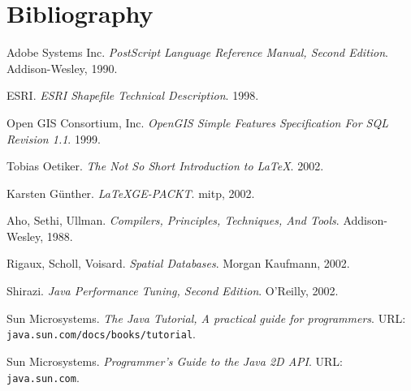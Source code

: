 
\section{Bibliography}

\begin{thebibliography}{99}

Adobe Systems Inc. \emph{PostScript Language Reference Manual, Second
Edition}.  Addison-Wesley, 1990.

ESRI. \emph{ESRI Shapefile Technical Description}. 1998.

Open GIS Consortium, Inc. \emph{OpenGIS Simple Features Specification
For SQL Revision 1.1}.  1999.

Tobias Oetiker. \emph{The Not So Short Introduction to
\LaTeX}.  2002.

Karsten G\"unther. \emph{\LaTeX GE-PACKT}. mitp, 2002.

Aho, Sethi, Ullman. \emph{Compilers, Principles, Techniques, And Tools}.
Addison-Wesley, 1988.

Rigaux, Scholl, Voisard. \emph{Spatial Databases}.
Morgan Kaufmann, 2002.

Shirazi. \emph{Java Performance Tuning, Second Edition}.
O'Reilly, 2002.

Sun Microsystems. \emph{The Java Tutorial, A practical guide for programmers}.
URL: \texttt{java.sun.com/docs/books/tutorial}.

Sun Microsystems. \emph{Programmer's Guide to the Java 2D API}.
URL: \texttt{java.sun.com}.

\end{thebibliography}

